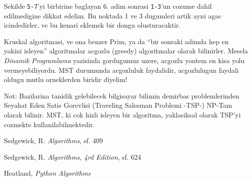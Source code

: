 \documentclass[12pt,fleqn]{article}\usepackage{../common}
\begin{document}
Sekilde \verb!5-7!'yi birbirine baglayan 6. adim sonrasi \verb!1-3!'un
cozume dahil edilmedigine dikkat edelim. Bu noktada 1 ve 3 dugumleri artik
ayni agac icindedirler, ve bu kenari eklemek bir dongu olusturacaktir. 

Kruskal algoritmasi, ve ona benzer Prim, ya da ``bir sonraki adimda hep en
yakini isleyen'' algoritmalar acgozlu (greedy) algoritmalar olarak
bilinirler. Mesela {\em Dinamik Programlama} yazisinda gordugumuz uzere,
acgozlu yontem en kisa yolu vermeyebiliyordu. MST durumunda acgozluluk
faydalidir, acgozlulugun faydali oldugu mutlu orneklerden biridir diyelim! 

Not: Bazilarina tanidik gelebilecek bilgisayar bilimin demirbas
problemlerinden Seyahat Eden Satis Gorevlisi (Traveling Salesman Problemi
-TSP-) NP-Tam olarak bilinir. MST, ki cok hizli isleyen bir algoritma,
yaklasiksal olarak TSP'yi cozmekte kullanilabilmektedir. 

Sedgewick, R. {\em Algorithms}, sf. 409

Sedgewick, R. {\em Algorithms, 4rd Edition}, sf. 624

Heatland, {\em Python Algorithms}
\end{document}
